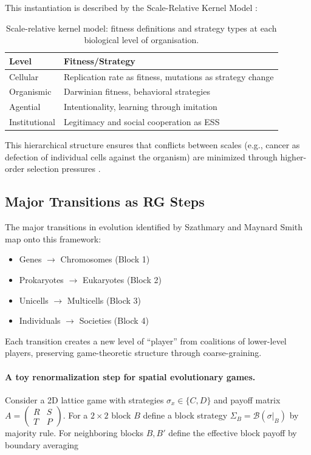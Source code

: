 \documentclass[12pt,a4paper]{article}
\theoremstyle{remark}
\begin{document}
This instantiation is described by the Scale-Relative Kernel Model \citep{ReplicatorOptimization}:

\begin{table}[ht]
\centering
\caption{Scale-relative kernel model: fitness definitions and strategy types at each biological level of organisation.}
\label{tab:scale-kernel}
\begin{tabular}{ll}
\toprule
\textbf{Level} & \textbf{Fitness/Strategy} \\
\midrule
Cellular & Replication rate as fitness, mutations as strategy change \\
Organismic & Darwinian fitness, behavioral strategies \\
Agential & Intentionality, learning through imitation \\
Institutional & Legitimacy and social cooperation as ESS \\
\bottomrule
\end{tabular}
\end{table}

This hierarchical structure ensures that conflicts between scales (e.g., cancer as defection of individual cells against the organism) are minimized through higher-order selection pressures \citep{ReplicatorOptimization}.

\subsection{Major Transitions as RG Steps}

The major transitions in evolution identified by Szathmary and Maynard Smith \citep{SzathmaryMaynardSmith1995} map onto this framework:

\begin{itemize}
    \item Genes $\to$ Chromosomes (Block 1)
    \item Prokaryotes $\to$ Eukaryotes (Block 2)
    \item Unicells $\to$ Multicells (Block 3)
    \item Individuals $\to$ Societies (Block 4)
\end{itemize}

Each transition creates a new level of ``player'' from coalitions of lower-level players, preserving game-theoretic structure through coarse-graining.

\paragraph{A toy renormalization step for spatial evolutionary games.}
Consider a 2D lattice game with strategies $\sigma_x\in\{C,D\}$ and payoff matrix
$A=\begin{pmatrix}R&S\\ T&P\end{pmatrix}$.
For a $2\times 2$ block $B$ define a block strategy $\Sigma_B=\mathcal B(\sigma|_B)$ by majority rule.
For neighboring blocks $B,B'$ define the effective block payoff by boundary averaging
\end{document}
